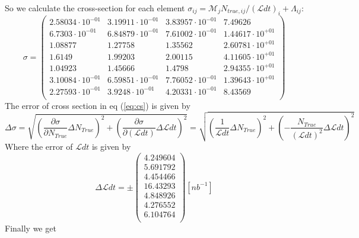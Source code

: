 \documentclass[]{article}
\begin{document}
So we calculate the cross-section for each element $\sigma_{ij} = \mathcal{M}_{j}N_{true,ij}/(\mathcal{L}dt)_i+\Lambda_{ij}$:
\begin{equation}
\sigma = 
\begin{pmatrix}
   2.58034\cdot 10^{-01} & 3.19911\cdot 10^{-01} & 3.83957\cdot 10^{-01} & 7.49626 \\
   6.7303\cdot 10^{-01} & 6.84879\cdot 10^{-01} & 7.61002\cdot 10^{-01} & 1.44617\cdot 10^{+01} \\
   1.08877 & 1.27758 & 1.35562 & 2.60781\cdot 10^{+01} \\
   1.6149 & 1.99203 & 2.00115 & 4.11605\cdot 10^{+01} \\
   1.04923 & 1.45666 & 1.4798 & 2.94355\cdot 10^{+01} \\
   3.10084\cdot 10^{-01} & 6.59851\cdot 10^{-01} & 7.76052\cdot 10^{-01} & 1.39643\cdot 10^{+01} \\
   2.27593\cdot 10^{-01} & 3.9248\cdot 10^{-01} & 4.20331\cdot 10^{-01} & 8.43569 \\
\end{pmatrix}
\end{equation}
The error of cross section in eq (\ref{eq:cs}) is given by
\begin{equation}
\Delta\sigma = \sqrt{\left(\frac{\partial\sigma}{\partial N_{True}}\Delta N_{True}\right)^2+
\left(\frac{\partial\sigma}{\partial (\mathcal{L}dt)}\Delta{\mathcal{L}dt}\right)^2} = \sqrt{\left(\frac{1}{\mathcal{L}dt}\Delta N_{True}\right)^2
+\left(-\frac{N_{True}}{(\mathcal{L}dt)^2}\Delta\mathcal{L}dt\right)^2}
\end{equation}
Where the error of $\mathcal{L}dt$ is given by
\begin{equation}
\Delta\mathcal{L}dt = \pm \begin{pmatrix}
   4.249604 \\
   5.691792 \\
   4.454466 \\
   16.43293 \\
   4.848926 \\
   4.276552 \\
   6.104764 \\
\end{pmatrix} [nb^{-1}]
\end{equation}
Finally we get
\end{document}
